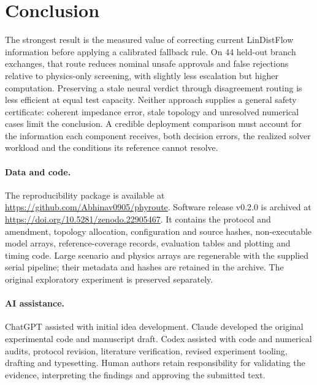 \section{Conclusion}

The strongest result is the measured value of correcting current LinDistFlow information before applying a calibrated fallback rule. On 44 held-out branch exchanges, that route reduces nominal unsafe approvals and false rejections relative to physics-only screening, with slightly less escalation but higher computation. Preserving a stale neural verdict through disagreement routing is less efficient at equal test capacity. Neither approach supplies a general safety certificate: coherent impedance error, stale topology and unresolved numerical cases limit the conclusion. A credible deployment comparison must account for the information each component receives, both decision errors, the realized solver workload and the conditions its reference cannot resolve.

\paragraph{Data and code.}
The reproducibility package is available at \url{https://github.com/Abhinav0905/phyroute}. Software release v0.2.0 is archived at \url{https://doi.org/10.5281/zenodo.22905467}. It contains the protocol and amendment, topology allocation, configuration and source hashes, non-executable model arrays, reference-coverage records, evaluation tables and plotting and timing code. Large scenario and physics arrays are regenerable with the supplied serial pipeline; their metadata and hashes are retained in the archive. The original exploratory experiment is preserved separately.

\paragraph{AI assistance.}
ChatGPT assisted with initial idea development. Claude developed the original experimental code and manuscript draft. Codex assisted with code and numerical audits, protocol revision, literature verification, revised experiment tooling, drafting and typesetting. Human authors retain responsibility for validating the evidence, interpreting the findings and approving the submitted text.
